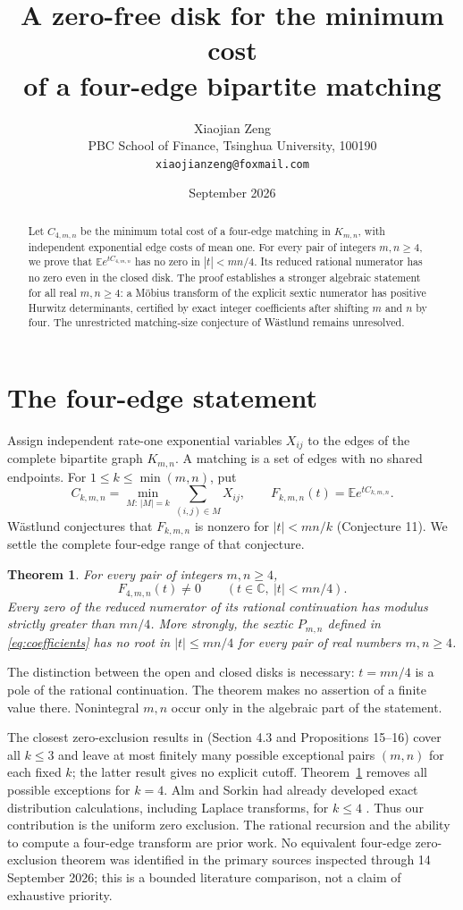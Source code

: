 \documentclass[11pt]{article}
\title{A zero-free disk for the minimum cost\\of a four-edge bipartite matching}
\author{Xiaojian Zeng\\[3pt]
  \small PBC School of Finance, Tsinghua University, 100190\\
  \small\texttt{xiaojianzeng@foxmail.com}}
\date{September 2026}
\newtheorem{theorem}{Theorem}
\newcommand{\E}{\mathbb E}
\newcommand{\C}{\mathbb C}
\begin{document}
\maketitle
\begin{abstract}
Let $C_{4,m,n}$ be the minimum total cost of a four-edge matching in
$K_{m,n}$, with independent exponential edge costs of mean one.
For every pair of integers $m,n\ge4$, we prove that
$\E e^{tC_{4,m,n}}$ has no zero in $|t|<mn/4$.
Its reduced rational numerator has no zero even in the closed disk.
The proof establishes a stronger algebraic statement for all real
$m,n\ge4$: a M\"obius transform of the explicit sextic numerator has
positive Hurwitz determinants, certified by exact integer coefficients
after shifting $m$ and $n$ by four. The unrestricted matching-size
conjecture of W\"astlund remains unresolved.
\end{abstract}

\section{The four-edge statement}

Assign independent rate-one exponential variables $X_{ij}$ to the edges
of the complete bipartite graph $K_{m,n}$. A matching is a set of edges
with no shared endpoints. For $1\le k\le\min(m,n)$, put
\[
 C_{k,m,n}=\min_{M:\,|M|=k}\sum_{(i,j)\in M}X_{ij},
 \qquad F_{k,m,n}(t)=\E e^{tC_{k,m,n}}.
\]
W\"astlund conjectures that $F_{k,m,n}$ is nonzero for
$|t|<mn/k$ \cite{wastlund2026} (Conjecture 11). We settle the complete
four-edge range of that conjecture.

\begin{theorem}\label{thm:main}
For every pair of integers $m,n\ge4$,
\[
 F_{4,m,n}(t)\neq0\qquad(t\in\C,\ |t|<mn/4).
\]
Every zero of the reduced numerator of its rational continuation has
modulus strictly greater than $mn/4$. More strongly, the sextic
$P_{m,n}$ defined in \eqref{eq:coefficients} has no root in
$|t|\le mn/4$ for every pair of real numbers $m,n\ge4$.
\end{theorem}

The distinction between the open and closed disks is necessary:
$t=mn/4$ is a pole of the rational continuation. The theorem makes
no assertion of a finite value there. Nonintegral $m,n$ occur only
in the algebraic part of the statement.

The closest zero-exclusion results in \cite{wastlund2026} (Section 4.3 and
Propositions 15--16) cover all $k\le3$ and leave at most
finitely many possible exceptional pairs $(m,n)$ for each fixed $k$;
the latter result gives no explicit cutoff. Theorem~\ref{thm:main}
removes all possible exceptions for $k=4$.
Alm and Sorkin had already developed exact distribution calculations,
including Laplace transforms, for $k\le4$ \cite{almsorkin2002}.
Thus our contribution is the uniform zero exclusion. The rational
recursion and the ability to compute a four-edge transform are prior work.
No equivalent four-edge zero-exclusion theorem was identified in the
primary sources inspected through 14 September 2026; this is a bounded
literature comparison, not a claim of exhaustive priority.
\end{document}

